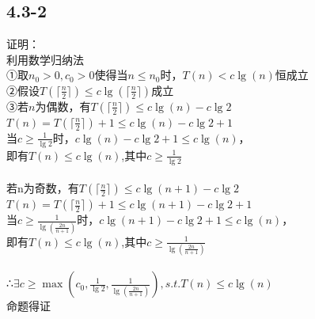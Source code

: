 \documentclass[UTF8]{ctexart}
\begin{document}
\subsection{4.3-2}
证明：\\
利用数学归纳法\\
①取$n_0>0, c_0>0$使得当$n\leq n_0$时，$T(n)<c\lg(n)$恒成立\\
②假设$T(\lceil\frac{n}{2}\rceil) \leq c\lg(\lceil\frac{n}{2}\rceil)$成立\\
③若$n$为偶数，有$T(\lceil\frac{n}{2}\rceil)\leq c\lg(n)-c\lg2$\\
$T(n)=T(\lceil\frac{n}{2}\rceil)+1 \leq c\lg(n)-c\lg2+1$\\
当$c \geq \frac{1}{\lg2}$时，$c\lg(n)-c\lg2+1 \leq c\lg(n)$，\\即有$T(n)\leq c\lg(n)$,其中$c \geq \frac{1}{\lg2}$\\\\
若n为奇数，有$T(\lceil\frac{n}{2}\rceil)\leq c\lg(n+1)-c\lg2$\\
$T(n)=T(\lceil\frac{n}{2}\rceil)+1 \leq c\lg(n+1)-c\lg2+1$\\
当$c \geq \frac{1}{\lg(\frac{2n}{n+1})}$时，$c\lg(n+1)-c\lg2+1 \leq c\lg(n)$，\\即有$T(n)\leq c\lg(n)$,其中$c \geq \frac{1}{\lg(\frac{2n}{n+1})}$\\\\
∴$\exists c \geq \max(c_0,\frac{1}{\lg2},\frac{1}{\lg(\frac{2n}{n+1})}), s.t.T(n)\leq c\lg(n)$\\命题得证
\end{document}
